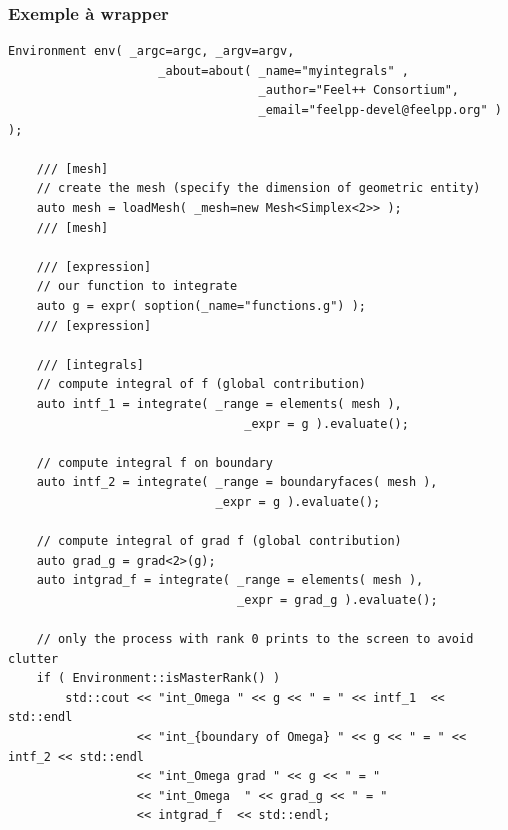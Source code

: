 \documentclass[french,12pt]{article}
\begin{document}
\subsubsection{Exemple à wrapper}
\begin{lstlisting}
Environment env( _argc=argc, _argv=argv,
                     _about=about( _name="myintegrals" ,
                                   _author="Feel++ Consortium",
                                   _email="feelpp-devel@feelpp.org" ) );

    /// [mesh]
    // create the mesh (specify the dimension of geometric entity)
    auto mesh = loadMesh( _mesh=new Mesh<Simplex<2>> );
    /// [mesh]

    /// [expression]
    // our function to integrate
    auto g = expr( soption(_name="functions.g") );
    /// [expression]

    /// [integrals]
    // compute integral of f (global contribution)
    auto intf_1 = integrate( _range = elements( mesh ),
                                 _expr = g ).evaluate();

    // compute integral f on boundary
    auto intf_2 = integrate( _range = boundaryfaces( mesh ),
                             _expr = g ).evaluate();

    // compute integral of grad f (global contribution)
    auto grad_g = grad<2>(g);
    auto intgrad_f = integrate( _range = elements( mesh ),
                                _expr = grad_g ).evaluate();

    // only the process with rank 0 prints to the screen to avoid clutter
    if ( Environment::isMasterRank() )
        std::cout << "int_Omega " << g << " = " << intf_1  << std::endl
                  << "int_{boundary of Omega} " << g << " = " << intf_2 << std::endl
                  << "int_Omega grad " << g << " = "
                  << "int_Omega  " << grad_g << " = "
                  << intgrad_f  << std::endl;
\end{lstlisting}
\end{document}

